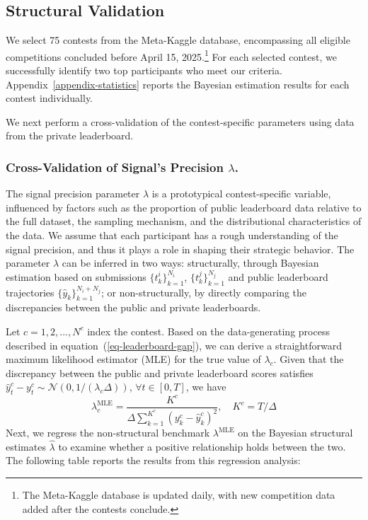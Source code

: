 \documentclass[mnsc]{informs3}
\begin{document}
\subsection{Structural Validation}


We select 75 contests from the Meta-Kaggle database, encompassing all eligible competitions concluded before April 15, 2025.\footnote{
The Meta-Kaggle database is updated daily, with new competition data added after the contests conclude.
}
For each selected contest, we successfully identify two top participants who meet our criteria.
Appendix~\ref{appendix-statistics} reports the Bayesian estimation results for each contest individually.

We next perform a cross-validation of the contest-specific parameters using data from the private leaderboard.

\subsubsection{Cross-Validation of Signal's Precision $\lambda$.}

The signal precision parameter $\lambda$ is a prototypical contest-specific variable, influenced by factors such as the proportion of public leaderboard data relative to the full dataset, the sampling mechanism, and the distributional characteristics of the data.
We assume that each participant has a rough understanding of the signal precision, and thus it plays a role in shaping their strategic behavior.
The parameter $\lambda$ can be inferred in two ways: structurally, through Bayesian estimation based on submissions $\{t^i_k\}_{k=1}^{N_i}$, $\{t^j_k\}_{k=1}^{N_j}$ and public leaderboard trajectories $\{\hat{y}_{k}\}_{k=1}^{N_i+N_j}$; or non-structurally, by directly comparing the discrepancies between the public and private leaderboards.

Let $c = {1, 2, ..., N^c}$ index the contest.
Based on the data-generating process described in equation~(\ref{eq-leaderboard-gap}), we can derive a straightforward maximum likelihood estimator (MLE) for the true value of $\lambda_c$.
Given that the discrepancy between the public and private leaderboard scores satisfies $\hat{y}_t^c - y_t^c \sim \mathcal{N}(0, 1/(\lambda_c\Delta))$, $\forall t \in [0, T]$, we have 
\begin{equation*}
\lambda^{\text{MLE}}_c = \frac{K^c}{\Delta\sum^{K^c}_{k=1}(y_k^c - \hat{y}_k^c)^2}, \quad K^c = T/\Delta
\end{equation*}
Next, we regress the non-structural benchmark $\lambda^{\text{MLE}}$ on the Bayesian structural estimates $\hat\lambda$ to examine whether a positive relationship holds between the two.
The following table reports the results from this regression analysis: 
\end{document}
